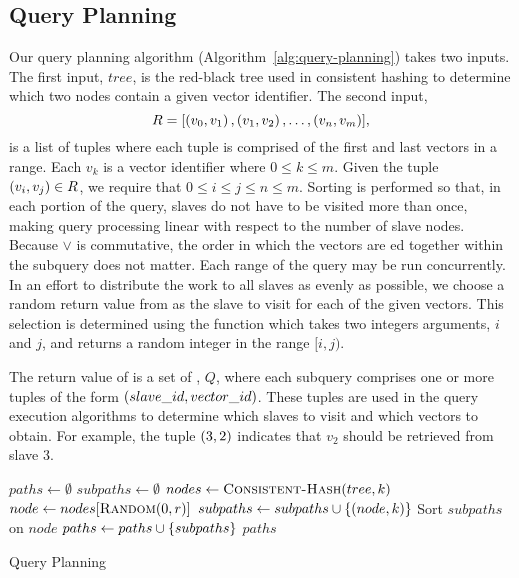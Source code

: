 \subsection{Query Planning}
Our query planning algorithm (Algorithm~\ref{alg:query-planning}) takes two
inputs. The first input, \(tree\), is the red-black tree used in consistent
hashing to determine which two nodes contain a given vector identifier.
The second input,
\[R = [\left(v_0, v_1\right), \left(v_1, v_2\right), \ldots, \left(v_n, v_m\right)],\]
is a list of tuples where each tuple is comprised of the first and last vectors
in a range. Each \(v_k\) is a vector identifier where \(0 \leq k \leq m\).
Given the tuple \(\left(v_i, v_j\right) \in R\), we require that
\(0 \leq i \leq j \leq n \leq m\). Sorting is performed so that, in each
portion of the query, slaves do not have to be visited more than once, making
query processing linear with respect to the number of slave nodes. Because
\(\lor\) is commutative, the order in which the vectors are ed
together within the subquery does not matter. Each range of the query may be
run concurrently. In an effort to distribute the work to all slaves as evenly
as possible, we choose a random return value from 
as the slave to visit for each of the given vectors. This selection is
determined using the  function which takes two integers
arguments, \(i\) and \(j\), and returns a random integer in the range
\([i, j)\).
\par
The return value of  is a set of ,
\(Q\), where each subquery comprises one or more tuples of the form
\(\left(slave\_id,vector\_id\right)\). These tuples are used in the query execution
algorithms to determine which slaves to visit and which vectors to obtain. For
example, the tuple \(\left(3, 2\right)\) indicates that \(v_2\) should be retrieved
from slave 3.
%
\begin{algorithm}
    \begin{algorithmic}
            \State $paths \gets \emptyset$
                \State $subpaths \gets \emptyset$
                    \State $nodes \gets \Call{Consistent-Hash}{tree, k}$
                    \State $node \gets nodes[\Call{Random}{0, r}]$
                    \State $subpaths \gets subpaths \cup \left\{(node, k)\right\}$
                \EndFor
                \State Sort $subpaths$ on $node$
                \State $paths \gets paths \cup \left\{subpaths\right\}$
            \EndFor
            \Return $paths$
        \EndProcedure
    \end{algorithmic}
    \caption{Query Planning}
    \label{alg:query-planning}
\end{algorithm}
%
